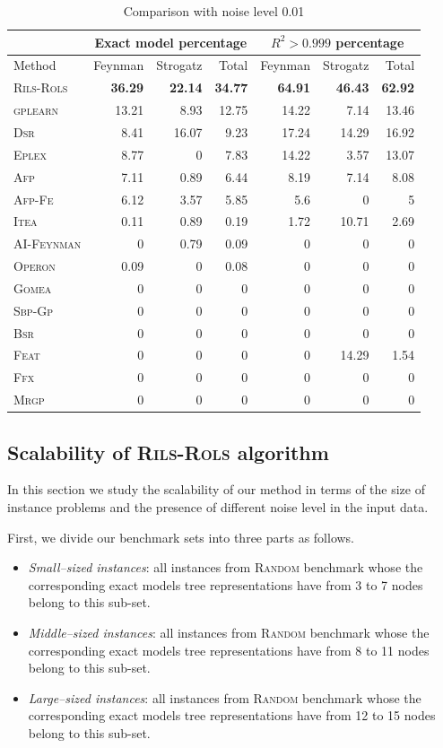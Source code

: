 \documentclass[a4paper,12pt]{elsarticle}
\begin{document}
\begin{table}[!htb]
	\caption{Comparison with noise level 0.01}\label{tab:comp_noise001}
	\centering
	\begin{tabular}{l|rrr|rrr} \hline
		& \multicolumn{3}{c|}{Exact model percentage} & \multicolumn{3}{c}{$R^2 > 0.999$ percentage}\\ \hline
		Method & Feynman & Strogatz & Total & Feynman & Strogatz & Total \\ \hline
		\textsc{Rils-Rols}&\bf{36.29}&\bf{22.14}&\bf{34.77}&\bf{64.91}&\bf{46.43}&\bf{62.92}\\
		\textsc{gplearn}&13.21&8.93&12.75&14.22&7.14&13.46\\
		\textsc{Dsr}&8.41&16.07&9.23&17.24&14.29&16.92\\
		\textsc{Eplex}&8.77&0&7.83&14.22&3.57&13.07\\
		\textsc{Afp}&7.11&0.89&6.44&8.19&7.14&8.08\\
		\textsc{Afp-Fe}&6.12&3.57&5.85&5.6&0&5\\
		\textsc{Itea}&0.11&0.89&0.19&1.72&10.71&2.69\\
		\textsc{AI-Feynman}&0&0.79&0.09&0&0&0\\
		\textsc{Operon}&0.09&0&0.08&0&0&0\\
		\textsc{Gomea}&0&0&0&0&0&0\\
		\textsc{Sbp-Gp}&0&0&0&0&0&0\\
		\textsc{Bsr}&0&0&0&0&0&0\\
		\textsc{Feat}&0&0&0&0&14.29&1.54\\
		\textsc{Ffx}&0&0&0&0&0&0\\
		\textsc{Mrgp}&0&0&0&0&0&0\\
		\hline
	\end{tabular}
\end{table}



\subsection{Scalability of \textsc{Rils}-\textsc{Rols} algorithm}

In this section we study the scalability of our method in terms of the size of  instance problems and  the presence of different noise level in the input data. 

First, we divide our benchmark sets into three parts as follows. 
\begin{itemize}
	\item \textit{Small--sized instances}: all instances from \textsc{Random} benchmark whose the corresponding exact models tree representations have from 3 to 7 nodes belong to this sub-set.
	\item \textit{Middle--sized instances}:  all instances from \textsc{Random} benchmark whose the corresponding exact models tree representations have from 8 to 11 nodes belong to this sub-set.
	\item \textit{Large--sized instances}: all instances from \textsc{Random} benchmark whose the corresponding exact models tree representations have from 12 to 15 nodes belong to this sub-set. 
\end{itemize}
\end{document}
